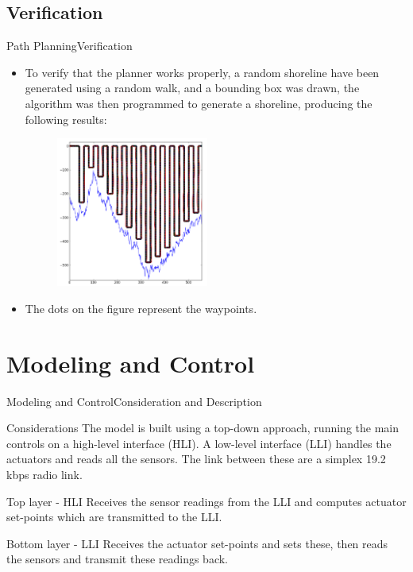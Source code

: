 \documentclass[10pt]{beamer}
\begin{document}
\subsection{Verification}
\begin{frame}{Path Planning}{Verification}
  \begin{itemize}
  	\item To verify that the planner works properly, a random shoreline have been generated using a random walk, and a bounding box was drawn, the algorithm was then programmed to generate a shoreline, producing the following results:
  	\begin{figure}
			\begin{center}
				\includegraphics[width=5cm]{img/Auto_WP_Planning}
				\label{fig:5points}
			\end{center}
		\end{figure}
		\item The dots on the figure represent the waypoints.
  \end{itemize}
\end{frame}

\section{Modeling and Control}
\begin{frame}{Modeling and Control}{Consideration and Description}
  \begin{block}{Considerations}
    The model is built using a top-down approach, running the main controls on a high-level interface (HLI). A low-level interface (LLI) handles the actuators and reads all the sensors. The link between these are a simplex 19.2 kbps radio link.
  \end{block}
  \begin{block}{Top layer - HLI}
    Receives the sensor readings from the LLI and computes actuator set-points which are transmitted to the LLI. 
  \end{block}
  \begin{block}{Bottom layer - LLI}
  Receives the actuator set-points and sets these, then reads the sensors and transmit these readings back. 
  \end{block}
\end{frame}
\end{document}
